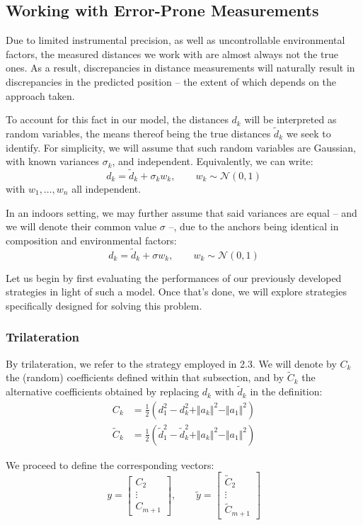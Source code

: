 \subsection{Working with Error-Prone Measurements}
Due to limited instrumental precision, as well as uncontrollable environmental factors, the measured distances we work with are almost always not the true ones. As a result, discrepancies in distance measurements will naturally result in discrepancies in the predicted position -- the extent of which depends on the approach taken.

To account for this fact in our model, the distances $d_k$ will be interpreted as random variables, the means thereof being the true distances $\widetilde d_k$ we seek to identify. For simplicity, we will assume that such random variables are Gaussian, with known variances $\sigma_k$, and independent. Equivalently, we can write:
\[
    d_k = \widetilde d_k + \sigma_k w_k, \qquad w_k\sim \mathcal N(0,1)
\]
with $w_1, \dots, w_n$ all independent.

In an indoors setting, we may further assume that said variances are equal -- and we will denote their common value $\sigma$ --, due to the anchors being identical in composition and environmental factors:
\[
    d_k = \widetilde d_k + \sigma w_k, \qquad w_k\sim \mathcal N(0,1)
\]

Let us begin by first evaluating the performances of our previously developed strategies in light of such a model. Once that's done, we will explore strategies specifically designed for solving this problem.

\subsubsection{Trilateration}
By trilateration, we refer to the strategy employed in 2.3. We will denote by $C_k$ the (random) coefficients defined within that subsection, and by $\widetilde C_k$ the alternative coefficients obtained by replacing $d_k$ with $\widetilde d_k$ in the definition:
\begin{align*}
    C_k &= \frac{1}{2} (d_1^2 - d_k^2 + \Vert a_k\Vert^2 - \Vert a_1\Vert^2) \\
    \widetilde C_k &= \frac{1}{2} (\widetilde d_1^2 - \widetilde d_k^2 + \Vert a_k\Vert^2 - \Vert a_1\Vert^2)
\end{align*}

We proceed to define the corresponding vectors:
\[
    y=
    \begin{bmatrix}
        C_2 \\ \vdots \\ C_{m+1}
    \end{bmatrix}, \qquad
    \widetilde y=
    \begin{bmatrix}
        \widetilde C_2 \\ \vdots \\ \widetilde C_{m+1}
    \end{bmatrix}
\]

